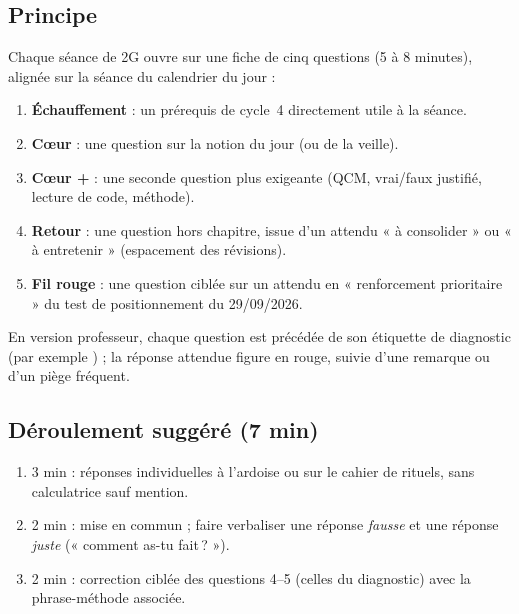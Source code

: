 \subsection*{Principe}
Chaque séance de 2G ouvre sur une fiche de cinq questions (5 à 8 minutes), alignée sur la séance du calendrier du jour :
\begin{enumerate}[label=\textbf{\arabic*.},leftmargin=1.6em]
  \item \textbf{Échauffement} : un prérequis de cycle~4 directement utile à la séance.
  \item \textbf{Cœur} : une question sur la notion du jour (ou de la veille).
  \item \textbf{Cœur +} : une seconde question plus exigeante (QCM, vrai/faux justifié, lecture de code, méthode).
  \item \textbf{Retour} : une question hors chapitre, issue d'un attendu « à consolider » ou « à entretenir » (espacement des révisions).
  \item \textbf{Fil rouge} : une question ciblée sur un attendu en « renforcement prioritaire » du test de positionnement du 29/09/2026.
\end{enumerate}
En version professeur, chaque question est précédée de son étiquette de diagnostic (par exemple ) ; la réponse attendue figure en rouge, suivie d'une remarque ou d'un piège fréquent.

\subsection*{Déroulement suggéré (7 min)}
\begin{enumerate}[label=\textbf{\arabic*.},leftmargin=1.6em]
  \item 3 min : réponses individuelles à l'ardoise ou sur le cahier de rituels, sans calculatrice sauf mention.
  \item 2 min : mise en commun ; faire verbaliser une réponse \emph{fausse} et une réponse \emph{juste} (« comment as-tu fait\,? »).
  \item 2 min : correction ciblée des questions 4--5 (celles du diagnostic) avec la phrase-méthode associée.
\end{enumerate}

